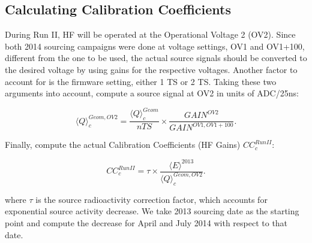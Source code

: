 \subsection{Calculating Calibration Coefficients}
During Run II, HF will be operated at the Operational Voltage 2 (OV2). Since
both 2014 sourcing campaigns were done at voltage settings, OV1 and OV1+100,
different from the one to be used, the actual source signals should be converted to
the desired voltage by using gains for the respective voltages. Another factor to
account for is the firmware setting, either 1 TS or 2 TS. Taking these two arguments
into account, compute a source signal at OV2 in units of ADC/25\unit{ns}:
\begin{center}
	\begin{equation}
		\label{eq:Sig_OV2}
		{\langle{Q}\rangle}^{Geom,OV2}_{c} = \frac{{\langle{Q}\rangle}^{Geom}_{c}}{nTS} \times \frac{{GAIN}^{OV2}}{{GAIN}^{OV1,OV1+100}}.
	\end{equation}
\end{center}
Finally, compute the actual Calibration Coefficients (HF Gains) ${CC}^{Run II}_{c}$:
\begin{center}
	\begin{equation}
		\label{eq:HF_Gains}
		{CC}^{Run II}_{c} = \tau \times \frac{{\langle{E}\rangle}^{2013}}{{\langle{Q}\rangle}^{Geom, OV2}_{c}}.
	\end{equation}
\end{center}
where $\tau$ is the source radioactivity correction factor, which accounts for exponential source activity decrease. We take 2013 sourcing date as the starting point and compute the decrease for April and July 2014 with respect to that date.
